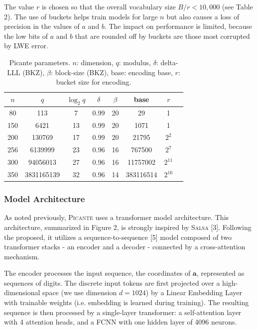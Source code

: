 \documentclass{article}
\begin{document}
The value \( r \) is chosen so that the overall vocabulary size \( B/r < 10,000 \) (see Table 2). The use of buckets helps train models for large \( n \) but also causes a loss of precision in the values of \( a \) and \( b \). The impact on performance is limited, because the low bits of \( a \) and \( b \) that are rounded off by buckets are those most corrupted by LWE error.

\begin{table}[h]
    \centering
    \begin{tabular}{|c|c|c|c|c|c|c|c|}
        \hline
        $n$ & $q$ & $\log_2 q$ & $\delta$ & $\beta$ & base & $r$ \\
        \hline
        80 & 113 & 7 & 0.99 & 20 & 29 & 1 \\
        150 & 6421 & 13 & 0.99 & 20 & 1071 & 1 \\
        200 & 130769 & 17 & 0.99 & 20 & 21795 & $2^2$ \\
        256 & 6139999 & 23 & 0.96 & 16 & 767500 & $2^7$ \\
        300 & 94056013 & 27 & 0.96 & 16 & 11757002 & $2^{11}$ \\
        350 & 3831165139 & 32 & 0.96 & 14 & 383116514 & $2^{16}$ \\
        \hline
    \end{tabular}
    \caption{Picante parameters. $n$: dimension, $q$: modulus, $\delta$: delta-LLL (BKZ), $\beta$: block-size (BKZ), base: encoding base, $r$: bucket size for encoding.}
    \label{tab:picante_parameters}
\end{table}

\subsubsection{Model Architecture}

As noted previously, \textsc{Picante} uses a transformer model architecture. This architecture, summarized in Figure 2, is strongly inspired by \textsc{Salsa} [3]. Following the proposed, it utilizes a sequence-to-sequence [5] model composed of two transformer stacks - an encoder and a decoder - connected by a cross-attention mechanism. 

The encoder processes the input sequence, the coordinates of $\mathbf{a}$, represented as sequences of digits. The discrete input tokens are first projected over a high-dimensional space (we use dimension $d = 1024$) by a Linear Embedding Layer with trainable weights (i.e. embedding is learned during training). The resulting sequence is then processed by a single-layer transformer: a self-attention layer with 4 attention heads, and a FCNN with one hidden layer of 4096 neurons.
\end{document}
